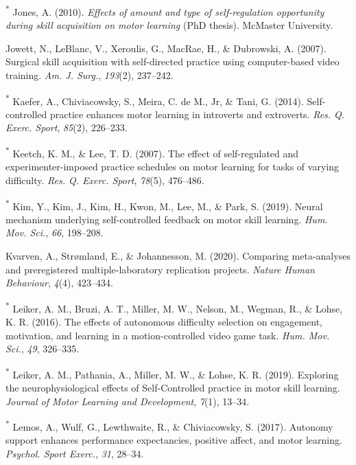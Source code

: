 \documentclass[
  english,
  man,floatsintext]{apa7}
\newlength{\cslhangindent}
\newlength{\cslentryspacingunit} %
\newenvironment{CSLReferences}[2] %
 {%
  \setlength{\parindent}{0pt}
  \ifodd #1
  \let\oldpar\par
  \def\par{\hangindent=\cslhangindent\oldpar}
  \fi
  \setlength{\parskip}{#2\cslentryspacingunit}
 }%
 {}
\begin{document}
\begin{CSLReferences}{1}{0}
\leavevmode{}%
\textsuperscript{*} Jones, A. (2010). \emph{Effects of amount and type of self-regulation opportunity during skill acquisition on motor learning} (PhD thesis). McMaster University.

\leavevmode{}%
Jowett, N., LeBlanc, V., Xeroulis, G., MacRae, H., \& Dubrowski, A. (2007). Surgical skill acquisition with self-directed practice using computer-based video training. \emph{Am. J. Surg.}, \emph{193}(2), 237--242.

\leavevmode{}%
\textsuperscript{*} Kaefer, A., Chiviacowsky, S., Meira, C. de M., Jr, \& Tani, G. (2014). Self-controlled practice enhances motor learning in introverts and extroverts. \emph{Res. Q. Exerc. Sport}, \emph{85}(2), 226--233.

\leavevmode{}%
\textsuperscript{*} Keetch, K. M., \& Lee, T. D. (2007). The effect of self-regulated and experimenter-imposed practice schedules on motor learning for tasks of varying difficulty. \emph{Res. Q. Exerc. Sport}, \emph{78}(5), 476--486.

\leavevmode{}%
\textsuperscript{*} Kim, Y., Kim, J., Kim, H., Kwon, M., Lee, M., \& Park, S. (2019). Neural mechanism underlying self-controlled feedback on motor skill learning. \emph{Hum. Mov. Sci.}, \emph{66}, 198--208.

\leavevmode{}%
Kvarven, A., Strømland, E., \& Johannesson, M. (2020). Comparing meta-analyses and preregistered multiple-laboratory replication projects. \emph{Nature Human Behaviour}, \emph{4}(4), 423--434.

\leavevmode{}%
\textsuperscript{*} Leiker, A. M., Bruzi, A. T., Miller, M. W., Nelson, M., Wegman, R., \& Lohse, K. R. (2016). The effects of autonomous difficulty selection on engagement, motivation, and learning in a motion-controlled video game task. \emph{Hum. Mov. Sci.}, \emph{49}, 326--335.

\leavevmode{}%
\textsuperscript{*} Leiker, A. M., Pathania, A., Miller, M. W., \& Lohse, K. R. (2019). Exploring the neurophysiological effects of {Self-Controlled} practice in motor skill learning. \emph{Journal of Motor Learning and Development}, \emph{7}(1), 13--34.

\leavevmode{}%
\textsuperscript{*} Lemos, A., Wulf, G., Lewthwaite, R., \& Chiviacowsky, S. (2017). Autonomy support enhances performance expectancies, positive affect, and motor learning. \emph{Psychol. Sport Exerc.}, \emph{31}, 28--34.


\end{CSLReferences}
\end{document}
